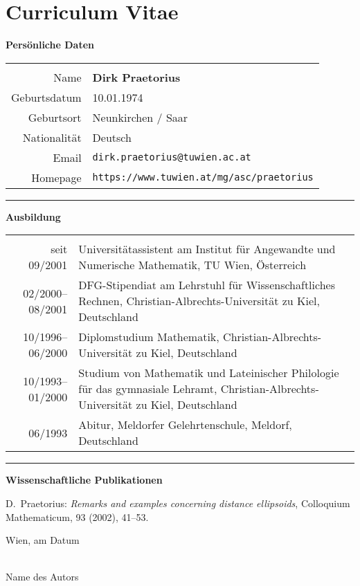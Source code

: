 \chapter*{Curriculum Vitae}
\thispagestyle{empty}

\noindent
{\bfseries\Large Persönliche Daten}

\begin{tabular}{rp{}}
\hspace*{.2\textwidth}&\\
Name & {\bfseries Dirk Praetorius} \\
Geburtsdatum & 10.01.1974 \\
Geburtsort & Neunkirchen / Saar \\
Nationalität & Deutsch \\
Email & \verb$dirk.praetorius@tuwien.ac.at$ \\
Homepage & \verb$https://www.tuwien.at/mg/asc/praetorius$ \\
\end{tabular}

\bigskip
\bigskip
\hrule
\bigskip
\bigskip

\noindent
{\bfseries\Large Ausbildung}

\begin{tabular}{rp{}}
\hspace*{.2\textwidth}&\\
seit 09/2001 & Universitätassistent am Institut für Angewandte und Numerische Mathematik, TU Wien, Österreich \\
02/2000--08/2001 & DFG-Stipendiat am Lehrstuhl für Wissenschaftliches Rechnen, Christian-Albrechts-Universität zu Kiel, Deutschland \\ 
10/1996--06/2000 & Diplomstudium Mathematik, Christian-Albrechts-Universität zu Kiel, Deutschland \\
10/1993--01/2000 & Studium von Mathematik und Lateinischer Philologie für das gymnasiale Lehramt, Christian-Albrechts-Universität zu Kiel, Deutschland \\
06/1993 & Abitur, Meldorfer Gelehrtenschule, Meldorf, Deutschland \\
\end{tabular}

\bigskip
\bigskip
\hrule
\bigskip
\bigskip

\noindent
{\bfseries\Large Wissenschaftliche Publikationen}

\bigskip

\noindent
D.~Praetorius: \emph{Remarks and examples concerning distance ellipsoids}, Colloquium Mathematicum, 93 (2002), 41--53.

\vspace*{3cm}

\noindent
Wien, am {\color{change}Datum} %
%
\hfill 
%
\begin{minipage}[t]{5cm}
\centering
\underline{\hspace*{5cm}}\\
\small\color{change}Name des Autors
\end{minipage}